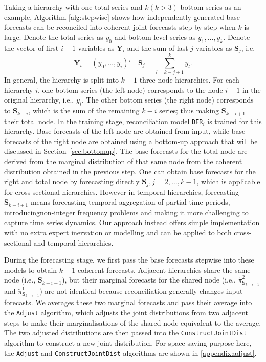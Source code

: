 \documentclass[a4paper,review,12pt,authoryear]{elsarticle}
\let\code=\texttt
\newcommand{\bY}{\mathbf{Y}}
\begin{document}
  Taking a hierarchy with one total series and $k (k>3)$ bottom series as an example, Algorithm \ref{alg:stepwise} shows how independently generated base forecasts can be reconciled into coherent joint forecasts step-by-step when $k$ is large. 
  Denote the total series as $y_0$ and bottom-level series as $y_1, \dots, y_k$. 
  Denote the vector of first $i+1$ variables as $\mathbf{Y}_i$ and the sum of last $j$ variables as $\mathbf{S}_j$, i.e.
  \[
    \bY_i = (y_0, \dots, y_i)' \quad \mathbf{S}_j = \sum_{l=k-j+1}^{k} y_l.
  \] 
  In general, the hierarchy is split into $k-1$ three-node hierarchies.  
  For each hierarchy $i$, one bottom series (the left node) corresponds to the node $i+1$ in the original hierarchy, i.e., $y_{i}$. The other bottom series (the right node) corresponds to $\mathbf{S}_{k-i}$, which is the sum of the remaining $k-i$ series; thus making $\mathbf{S}_{k-i+1}$ their total node.
  In the training stage, reconciliation model \code{DFR}$_i$ is trained for this hierarchy.
  Base forecasts of the left node are obtained from input, while base forecasts of the right node are obtained using a bottom-up approach that will be discussed in Section~\ref{sec:bottomup}. 
  The base forecasts for the total node are derived from the marginal distribution of that same node from the coherent distribution obtained in the previous step.
  One can obtain base forecasts for the right and total node by forecasting directly $\mathbf{S}_{j}, j=2,\dots,k-1$, which is applicable for cross-sectional hierarchies.
  However in temporal hierarchies, forecasting $\mathbf{S}_{k-i+1}$ means forecasting temporal aggregation of partial time periods, introducingnon-integer frequency problems and making it more challenging to capture time series dynamics.
  Our approach instead offers simple implementation with no extra expert inervation or modelling and can be applied to both cross-sectional and temporal hierarchies. 

  During the forecasting stage, we first pass the base forecasts stepwise into these models to obtain $k-1$ coherent forecasts.
  Adjacent hierarchies share the same node (i.e., $\mathbf{S}_{k-i+1}$), but their marginal forecasts for the shared node (i.e., $\tilde\pi^{2}_{\mathbf{S}_{k-i+1}}$ and $\tilde\pi^{1}_{\mathbf{S}_{k-i+1}}$) are not identical because reconciliation generally changes input forecasts.
  We averages these two marginal forecasts and pass their average into the \code{Adjust} algorithm, which adjusts the joint distributions from two adjacent steps to make their marginalisations of the shared node equivalent to the average.
  The two adjusted distributions are then passed into the \code{ConstructJointDist} algorithm to construct a new joint distribution.
  For space-saving purpose here, the \code{Adjust} and \code{ConstructJointDist} algorithms are shown in \ref{appendix:adjust}.
\end{document}
